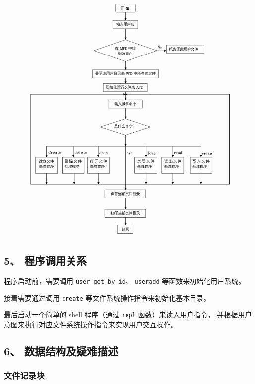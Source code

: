 \documentclass[12bp]{guo}
\begin{document}
\begin{figure}[h!]
    \centering
        \includegraphics[scale=0.75]{figures/4.flow.png}
\end{figure}


\subsection{5、 程序调用关系}

程序启动前，需要调用 \texttt{user_get_by_id}、 \texttt{useradd} 
等函数来初始化用户系统。


接着需要通过调用 \texttt{create} 等文件系统操作指令来初始化基本目录。


最后启动一个简单的 shell 程序（通过 \texttt{repl} 函数）来读入用户指令，
并根据用户意图来执行对应文件系统操作指令来实现用户交互操作。

\subsection{6、 数据结构及疑难描述}

\subsubsection{文件记录块}
\end{document}

